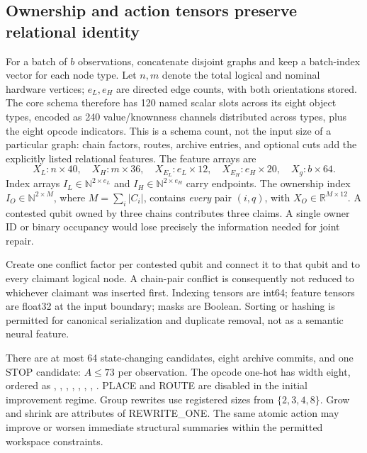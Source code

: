 \subsection{Ownership and action tensors preserve relational identity}

For a batch of \(b\) observations, concatenate disjoint graphs and keep a batch-index vector for each node type. Let \(n,m\) denote the total logical and nominal hardware vertices; \(e_L,e_H\) are directed edge counts, with both orientations stored. The core schema therefore has 120 named scalar slots across its eight object types, encoded as 240 value/knownness channels distributed across types, plus the eight opcode indicators. This is a schema count, not the input size of a particular graph: chain factors, routes, archive entries, and optional cuts add the explicitly listed relational features. The feature arrays are
\[
 X_L\!:\!n\times40,\quad X_H\!:\!m\times36,\quad
 X_{E_L}\!:\!e_L\times12,\quad X_{E_H}\!:\!e_H\times20,
 \quad X_g\!:\!b\times64.
\]
Index arrays \(I_L\in\mathbb N^{2\times e_L}\) and \(I_H\in\mathbb N^{2\times e_H}\) carry endpoints. The ownership index \(I_O\in\mathbb N^{2\times M}\), where \(M=\sum_i|C_i|\), contains \emph{every} pair \((i,q)\), with \(X_O\in\mathbb R^{M\times12}\). A contested qubit owned by three chains contributes three claims. A single owner ID or binary occupancy would lose precisely the information needed for joint repair.

Create one conflict factor per contested qubit and connect it to that qubit and to every claimant logical node. A chain-pair conflict is consequently not reduced to whichever claimant was inserted first. Indexing tensors are int64; feature tensors are float32 at the input boundary; masks are Boolean. Sorting or hashing is permitted for canonical serialization and duplicate removal, not as a semantic neural feature.

There are at most 64 state-changing candidates, eight archive commits, and one STOP candidate: \(A\le73\) per observation. The opcode one-hot has width eight, ordered as , , , , , , , . PLACE and ROUTE are disabled in the initial improvement regime. Group rewrites use registered sizes from \(\{2,3,4,8\}\). Grow and shrink are attributes of REWRITE\_ONE. The same atomic action may improve or worsen immediate structural summaries within the permitted workspace constraints.

